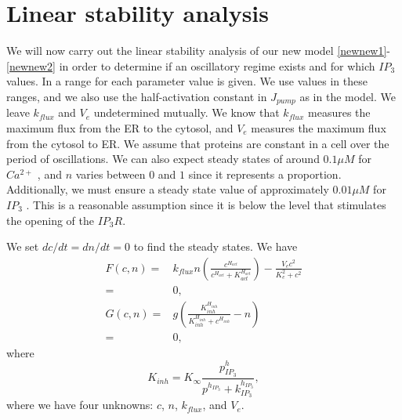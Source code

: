 \section{Linear stability analysis}
We will now carry out the linear stability analysis of our new model \eqref{newnew1}-\eqref{newnew2} in order to determine if an oscillatory regime exists and for which $IP_3$ values. In  a range for each parameter value is given. We use values in these ranges, and we also use the half-activation constant in $J_{pump}$ as in the  model. We leave $k_{flux}$ and $V_e$ undetermined mutually. We know that $k_{flux}$ measures the maximum flux from the ER to the cytosol, and $V_e$ measures the maximum flux from the cytosol to ER. We assume that proteins are constant in a cell over the period of oscillations. We can also expect steady states of around $0.1 \mu M$ for $Ca^{2+}$ \cite{Berridge, kline}, and $n$ varies between $0$ and $1$ since it represents a proportion. Additionally, we must ensure a steady state value of approximately $0.01 \mu M$ for $IP_3$ \cite{Mak1998,karl}. This is a reasonable assumption since it is below the level that stimulates the opening of the $IP_3R$.

We set $dc/dt=dn/dt=0$ to find the steady states. We have
\begin{align}
    F(c,n)=&k_{flux}n{\left(\frac{c^{H_{act}}}{c^{H_{act}}+K_{act}^{H_{act}}}\right)}-\frac{V_ec^2}{K_e^2+c^2}\nonumber\\
    =&0,\label{newnewnew1}\\
    G(c,n)=&g{\left(\frac{K_{inh}^{H_{inh}}}{K_{inh}^{H_{inh}}+c^{H_{inh}}}-n\right)}\nonumber\\
    =&0,\label{newnewnew2}
\end{align}
where
\begin{equation}
    K_{inh}=K_{\infty}\frac{p^h_{IP_3}}{p^{h_{IP_3}}+k_{IP_3}^{h_{IP_3}}},\nonumber
\end{equation}
where we have four unknowns: $c$, $n$, $k_{flux}$, and $V_e$.

